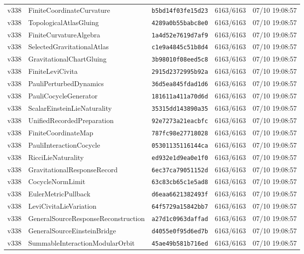\documentclass[11pt]{article}
\theoremstyle{definition}\newtheorem{deriv}{Derivation}
\begin{document}
{\begin{longtable}{@{}lllll@{}}
v338 & FiniteCoordinateCurvature & \texttt{b5bd14f03fe15d23} & 6163/6163 & 07/10 19:08:57 \\
v338 & TopologicalAtlasGluing & \texttt{4289a0b55babc8e0} & 6163/6163 & 07/10 19:08:57 \\
v338 & FiniteCurvatureAlgebra & \texttt{1a4d52e7619d7af9} & 6163/6163 & 07/10 19:08:57 \\
v338 & SelectedGravitationalAtlas & \texttt{c1e9a4845c51b8d4} & 6163/6163 & 07/10 19:08:57 \\
v338 & GravitationalChartGluing & \texttt{3b98010f08eed5c8} & 6163/6163 & 07/10 19:08:57 \\
v338 & FiniteLeviCivita & \texttt{2915d2372995b92a} & 6163/6163 & 07/10 19:08:57 \\
v338 & PauliPerturbedDynamics & \texttt{36d5ea845fdad1d6} & 6163/6163 & 07/10 19:08:57 \\
v338 & PauliCocycleGenerator & \texttt{181611a411a70d6d} & 6163/6163 & 07/10 19:08:57 \\
v338 & ScalarEinsteinLieNaturality & \texttt{35315dd143890a35} & 6163/6163 & 07/10 19:08:57 \\
v338 & UnifiedRecordedPreparation & \texttt{92e7273a21eacbfc} & 6163/6163 & 07/10 19:08:57 \\
v338 & FiniteCoordinateMap & \texttt{787fc98e27718028} & 6163/6163 & 07/10 19:08:57 \\
v338 & PauliInteractionCocycle & \texttt{05301135116144ca} & 6163/6163 & 07/10 19:08:57 \\
v338 & RicciLieNaturality & \texttt{ed932e1d9ea0e1f0} & 6163/6163 & 07/10 19:08:57 \\
v338 & GravitationalResponseRecord & \texttt{6ec37ca79051152d} & 6163/6163 & 07/10 19:08:57 \\
v338 & CocycleNormLimit & \texttt{63c83cb65c1e5ad8} & 6163/6163 & 07/10 19:08:57 \\
v338 & EulerMetricPullback & \texttt{d6eaa6621382493f} & 6163/6163 & 07/10 19:08:57 \\
v338 & LeviCivitaLieVariation & \texttt{64f5729a15842bb7} & 6163/6163 & 07/10 19:08:57 \\
v338 & GeneralSourceResponseReconstruction & \texttt{a27d1c0963daffad} & 6163/6163 & 07/10 19:08:57 \\
v338 & GeneralSourceEinsteinBridge & \texttt{d4055e0f95d6ed7b} & 6163/6163 & 07/10 19:08:57 \\
v338 & SummableInteractionModularOrbit & \texttt{45ae49b581b716ed} & 6163/6163 & 07/10 19:08:57 \\

\end{longtable}}
\end{document}
